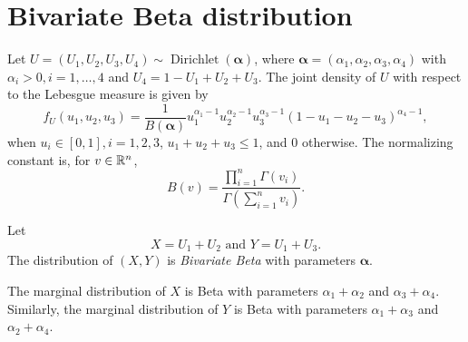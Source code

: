 \chapter{Bivariate Beta distribution}
\label{appendix:bivariate-beta-distribution}

Let $U = (U_1, U_2, U_3, U_4) \sim
\operatorname{Dirichlet}(\boldsymbol{\alpha})$, where $\boldsymbol{\alpha} =
(\alpha_1, \alpha_2, \alpha_3, \alpha_4)$ with $\alpha_i > 0, i = 1,\dots,4$
and $U_4 = 1 - U_1 + U_2 + U_3$. The joint density of $U$ with respect to the
Lebesgue measure is given by
\begin{equation}
  f_U(u_1, u_2, u_3) = \frac{1}{B(\boldsymbol{\alpha})}u_1^{\alpha_1-1}u_2^{\alpha_2-1}u_3^{\alpha_3-1}(1-u_1-u_2-u_3)^{\alpha_4-1}, 
\end{equation}
when $u_i \in [0,1], i = 1,2,3$, $u_1 + u_2 + u_3 \le 1$, and $0$ otherwise.
The normalizing constant is, for $v \in \mathbb{R}^n$,
$$B(v) = \frac{\prod_{i=1}^n \Gamma(v_i)}{\Gamma\left(\sum_{i=1}^n v_i\right)}.$$ 

\begin{definition}
  Let 
  \begin{equation}
    X = U_1 + U_2 \text{ and } Y = U_1 + U_3.
  \end{equation} 
    The distribution of $(X,Y)$ is {\em Bivariate Beta} with parameters
    $\boldsymbol{\alpha}$. 
\end{definition}

\begin{proposition}
  The marginal distribution of $X$ is Beta with parameters $\alpha_1 +
  \alpha_2$ and $\alpha_3 + \alpha_4$. Similarly, the marginal distribution of
  $Y$ is Beta with parameters $\alpha_1 + \alpha_3$ and $\alpha_2 + \alpha_4$.
\end{proposition}

